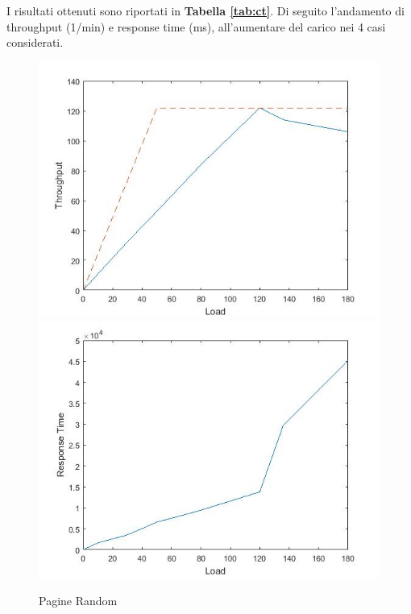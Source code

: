 		I risultati ottenuti sono riportati in \textbf{Tabella \ref{tab:ct}}. Di seguito l'andamento di throughput (1/min) e response time (ms), all'aumentare del carico nei 4 casi considerati.
		
		\begin{figure}[H]
			\centering
			\includegraphics[scale=0.6]{./immagine/randomT.jpg}
			\includegraphics[scale=0.6]{./immagine/randomR.jpg}
			\caption{Pagine Random}
			\label{fig:ct-r}
		\end{figure}
